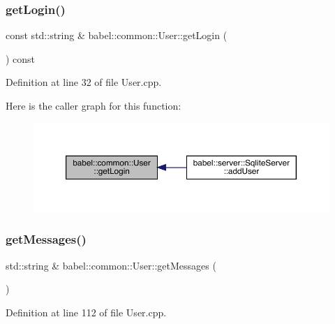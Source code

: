 \subsubsection{\texorpdfstring{get\+Login()}{getLogin()}}
{\footnotesize\ttfamily const std\+::string \& babel\+::common\+::\+User\+::get\+Login (\begin{DoxyParamCaption}{ }\end{DoxyParamCaption}) const}



Definition at line 32 of file User.\+cpp.

Here is the caller graph for this function\+:\nopagebreak
\begin{figure}[H]
\begin{center}
\leavevmode
\includegraphics[width=350pt]{classbabel_1_1common_1_1_user_a9e4935028bc942da08a2eafcd4b0008b_icgraph}
\end{center}
\end{figure}
\mbox{\label{classbabel_1_1common_1_1_user_a6ab6d31606d207c4a8669ca77372fdad}} 
\subsubsection{\texorpdfstring{get\+Messages()}{getMessages()}}
{\footnotesize\ttfamily std\+::string \& babel\+::common\+::\+User\+::get\+Messages (\begin{DoxyParamCaption}{ }\end{DoxyParamCaption})}



Definition at line 112 of file User.\+cpp.

\mbox{\label{classbabel_1_1common_1_1_user_a2b5c6ca06f0a664ba93ae3d4f473a887}} 
